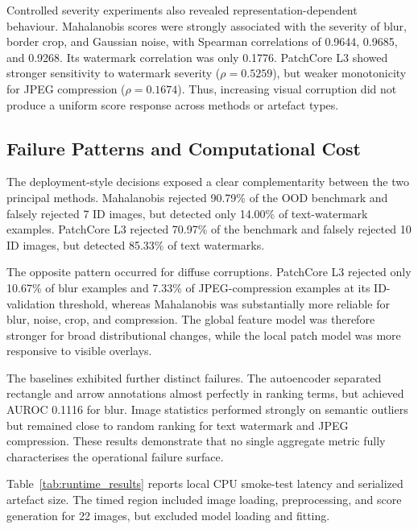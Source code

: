 \documentclass[fleqn,12pt]{olplainarticle}
\begin{document}
Controlled severity experiments also revealed representation-dependent
behaviour. Mahalanobis scores were strongly associated with the severity of
blur, border crop, and Gaussian noise, with Spearman correlations of 0.9644,
0.9685, and 0.9268. Its watermark correlation was only 0.1776. PatchCore L3
showed stronger sensitivity to watermark severity
($\rho=0.5259$), but weaker monotonicity for JPEG compression
($\rho=0.1674$). Thus, increasing visual corruption did not produce a
uniform score response across methods or artefact types.

\subsection{Failure Patterns and Computational Cost}
\label{subsec:failure_results}
\label{subsec:runtime_results}

The deployment-style decisions exposed a clear complementarity between the
two principal methods. Mahalanobis rejected 90.79\% of the OOD benchmark and
falsely rejected 7 ID images, but detected only 14.00\% of text-watermark
examples. PatchCore L3 rejected 70.97\% of the benchmark and falsely rejected
10 ID images, but detected 85.33\% of text watermarks.

The opposite pattern occurred for diffuse corruptions. PatchCore L3 rejected
only 10.67\% of blur examples and 7.33\% of JPEG-compression examples at its
ID-validation threshold, whereas Mahalanobis was substantially more reliable
for blur, noise, crop, and compression. The global feature model was therefore
stronger for broad distributional changes, while the local patch model was
more responsive to visible overlays.

The baselines exhibited further distinct failures. The autoencoder separated
rectangle and arrow annotations almost perfectly in ranking terms, but
achieved AUROC 0.1116 for blur. Image statistics performed strongly on
semantic outliers but remained close to random ranking for text watermark
and JPEG compression. These results demonstrate that no single aggregate
metric fully characterises the operational failure surface.

Table~\ref{tab:runtime_results} reports local CPU smoke-test latency and
serialized artefact size. The timed region included image loading,
preprocessing, and score generation for 22 images, but excluded model loading
and fitting.
\end{document}
